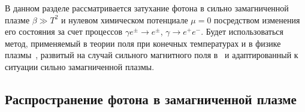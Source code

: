 
В данном разделе рассматривается затухание фотона в сильно замагниченной плазме $\beta \gg T^2$
и нулевом химическом потенциале $\mu = 0$ посредством изменения его состояния за счет процессов $\gamma e^\pm\to e^\pm$, $\gamma \to e^+e^-$. Будет использоваться метод, применяемый в теории поля при конечных температурах и в физике плазмы~\cite{Boyan}, развитый на случай сильного магнитного поля в~\cite{MikhChist:2001} и адаптированный к ситуации сильно замагниченной плазмы.

\subsection{Распространение фотона в замагниченной плазме}

